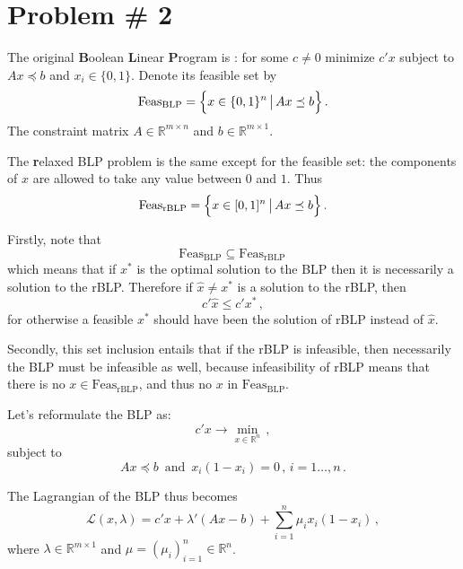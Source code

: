 \documentclass[a4paper]{article}
\newcommand{\Real}{\mathbb{R}}
\newcommand{\Lcal}{\mathcal{L}}
\begin{document}

\section{Problem \# 2} %
\label{sec:problem_2}

The original \textbf{B}oolean \textbf{L}inear \textbf{P}rogram is : for some $c\neq 0$
minimize $c'x$ subject to $Ax \preceq b$ and $x_i\in\{0,1\}$. Denote its feasible set by
\[ \text{Feas}_{\text{BLP}} = \Bigl\{ x \in \{0,1\}^n \,\big|\, Ax \preceq b \Bigr\} \,. \]
The constraint matrix $A \in \Real^{m\times n}$ and $b \in \Real^{m\times 1}$.

The \textbf{r}elaxed BLP problem is the same except for the feasible set: the components
of $x$ are allowed to take any value between $0$ and $1$. Thus
\[ \text{Feas}_{\text{rBLP}} = \Bigl\{ x \in [0,1]^n \,\big|\, Ax \preceq b \Bigr\} \,. \]

Firstly, note that 
\[ \text{Feas}_{\text{BLP}} \subseteq \text{Feas}_{\text{rBLP}} \, \]
which means that if $x^*$ is the optimal solution to the BLP then it is necessarily
a solution to the rBLP. Therefore if $\hat{x}\neq x^*$ is a solution to the rBLP, then
\[ c'\hat{x} \leq c'x^* \,, \]
for otherwise a feasible $x^*$ should have been the solution of rBLP instead of $\hat{x}$.

Secondly, this set inclusion entails that if the rBLP is infeasible, then necessarily
the BLP must be infeasible as well, because infeasibility of rBLP means that there is
no $x\in \text{Feas}_{\text{rBLP}}$, and thus no $x$ in $\text{Feas}_{\text{BLP}}$.

Let's reformulate the BLP as:
\[ c'x \to \min_{x\in \Real^n}\,, \]
subject to 
\[ Ax \preceq b\,\text{ and }\, x_i(1-x_i) = 0\,,\, i=1\ldots, n \,. \]

The Lagrangian of the BLP thus becomes
\[
\Lcal( x, \lambda )
= c'x + \lambda' (A x - b) + \sum_{i=1}^n \mu_i x_i (1-x_i) \,,
\]
where $\lambda \in \Real^{m\times 1}$ and $\mu=(\mu_i)_{i=1}^n \in \Real^n$.
\end{document}
